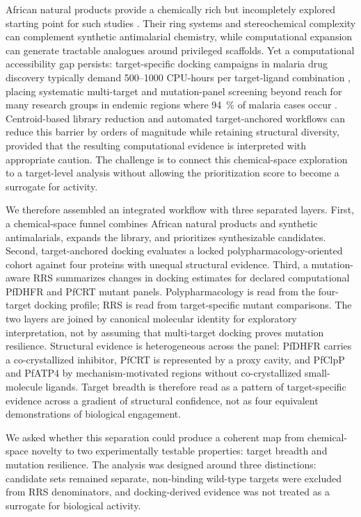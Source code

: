 \documentclass[11pt,a4paper]{article}
\begin{document}
	African natural products provide a chemically rich but incompletely explored starting point for such studies \cite{Newman2007,NtieKang2018,Simoben2023,Cheuka2020}. Their ring systems and stereochemical complexity can complement synthetic antimalarial chemistry, while computational expansion can generate tractable analogues around privileged scaffolds. Yet a computational accessibility gap persists: target-specific docking campaigns in malaria drug discovery typically demand \numrange{500}{1000} CPU-hours per target-ligand combination \cite{Trott2009,Eberhardt2021}, placing systematic multi-target and mutation-panel screening beyond reach for many research groups in endemic regions where \qty{94}{\percent} of malaria cases occur \cite{WHO2024MalariaReport}. Centroid-based library reduction and automated target-anchored workflows can reduce this barrier by orders of magnitude while retaining structural diversity, provided that the resulting computational evidence is interpreted with appropriate caution. The challenge is to connect this chemical-space exploration to a target-level analysis without allowing the prioritization score to become a surrogate for activity.
	
	We therefore assembled an integrated workflow with three separated layers. First, a chemical-space funnel combines African natural products and synthetic antimalarials, expands the library, and prioritizes synthesizable candidates. Second, target-anchored docking evaluates a locked polypharmacology-oriented cohort against four proteins with unequal structural evidence. Third, a mutation-aware RRS summarizes changes in docking estimates for declared computational PfDHFR and PfCRT mutant panels. Polypharmacology is read from the four-target docking profile; RRS is read from target-specific mutant comparisons. The two layers are joined by canonical molecular identity for exploratory interpretation, not by assuming that multi-target docking proves mutation resilience. Structural evidence is heterogeneous across the panel: PfDHFR carries a co-crystallized inhibitor, PfCRT is represented by a proxy cavity, and PfClpP and PfATP4 by mechanism-motivated regions without co-crystallized small-molecule ligands. Target breadth is therefore read as a pattern of target-specific evidence across a gradient of structural confidence, not as four equivalent demonstrations of biological engagement.
	
	We asked whether this separation could produce a coherent map from chemical-space novelty to two experimentally testable properties: target breadth and mutation resilience. The analysis was designed around three distinctions: candidate sets remained separate, non-binding wild-type targets were excluded from RRS denominators, and docking-derived evidence was not treated as a surrogate for biological activity.
	
\end{document}
